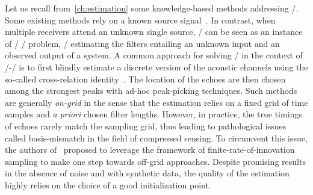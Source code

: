 
Let us recall from~\cref{ch:estimation} some knowledge-based methods addressing \AER/.
Some existing methods rely on a known source signal~.
In contrast, when multiple receivers attend an unknown single source, \AER/ can be seen as an instance of \SIMOdef/ \BCEdef/ problem, \ie/ estimating the filters entailing an unknown input and an observed output of a system.
A common approach for solving \AER/ in the context of \SIMO/-\BCE/ is to first blindly estimate a discrete version of the acoustic channels using the so-called cross-relation identity~.
The location of the echoes are then chosen among the strongest peaks with ad-hoc peak-picking techniques.
Such methods are generally \emph{on-grid} in the sense that the estimation relies on a fixed grid of time samples and \textit{a priori} chosen filter lengths.
However, in practice, the true timings of echoes rarely match the sampling grid, thus leading to pathological issues called basis-mismatch in the field of compressed sensing.
To circumvent this issue, the authors of~ proposed to leverage the framework of finite-rate-of-innovation sampling to make one step towards off-grid approaches.
Despite promising results in the absence of noise and with synthetic data, the quality of the estimation highly relies on the choice of a good initialization point.

